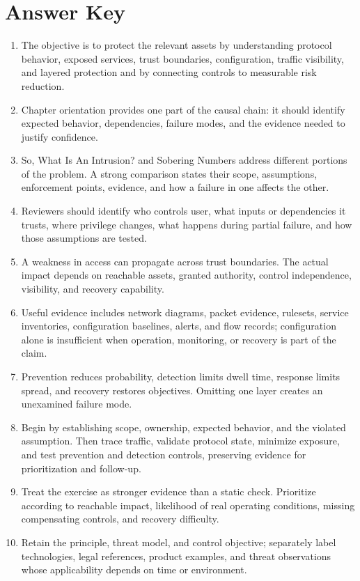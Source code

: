 \documentclass[11pt,letterpaper]{article}
\begin{document}
\section*{Answer Key}
\begin{enumerate}
\item The objective is to protect the relevant assets by understanding protocol behavior, exposed services, trust boundaries, configuration, traffic visibility, and layered protection and by connecting controls to measurable risk reduction.
\item Chapter orientation provides one part of the causal chain: it should identify expected behavior, dependencies, failure modes, and the evidence needed to justify confidence.
\item So, What Is An Intrusion? and Sobering Numbers address different portions of the problem. A strong comparison states their scope, assumptions, enforcement points, evidence, and how a failure in one affects the other.
\item Reviewers should identify who controls user, what inputs or dependencies it trusts, where privilege changes, what happens during partial failure, and how those assumptions are tested.
\item A weakness in access can propagate across trust boundaries. The actual impact depends on reachable assets, granted authority, control independence, visibility, and recovery capability.
\item Useful evidence includes network diagrams, packet evidence, rulesets, service inventories, configuration baselines, alerts, and flow records; configuration alone is insufficient when operation, monitoring, or recovery is part of the claim.
\item Prevention reduces probability, detection limits dwell time, response limits spread, and recovery restores objectives. Omitting one layer creates an unexamined failure mode.
\item Begin by establishing scope, ownership, expected behavior, and the violated assumption. Then trace traffic, validate protocol state, minimize exposure, and test prevention and detection controls, preserving evidence for prioritization and follow-up.
\item Treat the exercise as stronger evidence than a static check. Prioritize according to reachable impact, likelihood of real operating conditions, missing compensating controls, and recovery difficulty.
\item Retain the principle, threat model, and control objective; separately label technologies, legal references, product examples, and threat observations whose applicability depends on time or environment.
\end{enumerate}
\end{document}

